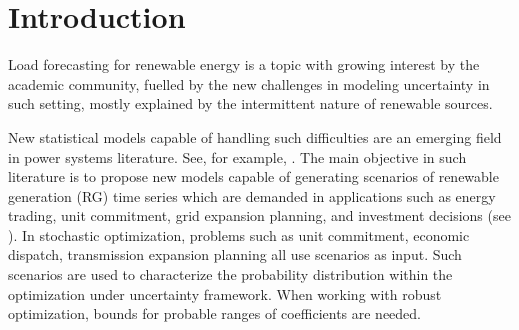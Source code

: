 \section{Introduction} \label{sec:introduction}


Load forecasting for renewable energy is a topic with growing interest by the academic community, fuelled by the new challenges in modeling uncertainty in such setting, mostly explained by the intermittent nature of renewable sources.    %


New statistical models capable of handling such difficulties are an emerging field in power systems literature. See, for example, \cite{bessa2012time, gallego2016line,moller_time-adaptive_2008,nielsen2006,bremnes_probabilistic_2004,wan_direct_2017}. 
The main objective in such literature is to propose new models capable of generating scenarios of renewable generation (RG) time series which are demanded in applications such as energy trading, unit commitment,  grid expansion planning, and investment decisions (see \cite{moreiraStreet,jabr2013robust,zhaoguan,Aderson2017}). 
In stochastic optimization, problems such as unit commitment, economic dispatch, transmission expansion planning all use scenarios as input. 
Such scenarios are used to characterize the probability distribution within the optimization under uncertainty framework.
When working with robust optimization, bounds for probable ranges of coefficients are needed.

 
